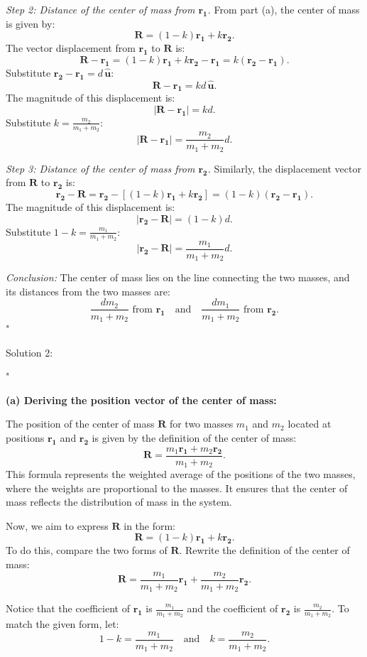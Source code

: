\textit{Step 2: Distance of the center of mass from $\mathbf{r_1}$.}  
From part (a), the center of mass is given by:
\[
\mathbf{R} = (1 - k)\mathbf{r_1} + k\mathbf{r_2}.
\]
The vector displacement from $\mathbf{r_1}$ to $\mathbf{R}$ is:
\[
\mathbf{R} - \mathbf{r_1} = (1 - k)\mathbf{r_1} + k\mathbf{r_2} - \mathbf{r_1} = k(\mathbf{r_2} - \mathbf{r_1}).
\]
Substitute $\mathbf{r_2} - \mathbf{r_1} = d \, \hat{\mathbf{u}}$:
\[
\mathbf{R} - \mathbf{r_1} = k d \, \hat{\mathbf{u}}.
\]
The magnitude of this displacement is:
\[
|\mathbf{R} - \mathbf{r_1}| = k d.
\]
Substitute $k = \frac{m_2}{m_1 + m_2}$:
\[
|\mathbf{R} - \mathbf{r_1}| = \frac{m_2}{m_1 + m_2} d.
\]

\textit{Step 3: Distance of the center of mass from $\mathbf{r_2}$.}  
Similarly, the displacement vector from $\mathbf{R}$ to $\mathbf{r_2}$ is:
\[
\mathbf{r_2} - \mathbf{R} = \mathbf{r_2} - \left[(1 - k)\mathbf{r_1} + k\mathbf{r_2}\right] = (1 - k)(\mathbf{r_2} - \mathbf{r_1}).
\]
The magnitude of this displacement is:
\[
|\mathbf{r_2} - \mathbf{R}| = (1 - k)d.
\]
Substitute $1 - k = \frac{m_1}{m_1 + m_2}$:
\[
|\mathbf{r_2} - \mathbf{R}| = \frac{m_1}{m_1 + m_2} d.
\]

\textit{Conclusion:}  
The center of mass lies on the line connecting the two masses, and its distances from the two masses are:
\[
\frac{d m_2}{m_1 + m_2} \text{ from } \mathbf{r_1} \quad \text{and} \quad \frac{d m_1}{m_1 + m_2} \text{ from } \mathbf{r_2}.
\]"

Solution 2:

"

\textbf{(a) Deriving the position vector of the center of mass:}

The position of the center of mass $\mathbf{R}$ for two masses $m_1$ and $m_2$ located at positions $\mathbf{r_1}$ and $\mathbf{r_2}$ is given by the definition of the center of mass:
\[
\mathbf{R} = \frac{m_1\mathbf{r_1} + m_2\mathbf{r_2}}{m_1 + m_2}.
\]
This formula represents the weighted average of the positions of the two masses, where the weights are proportional to the masses. It ensures that the center of mass reflects the distribution of mass in the system.

Now, we aim to express $\mathbf{R}$ in the form:
\[
\mathbf{R} = (1 - k)\mathbf{r_1} + k\mathbf{r_2}.
\]
To do this, compare the two forms of $\mathbf{R}$. Rewrite the definition of the center of mass:
\[
\mathbf{R} = \frac{m_1}{m_1 + m_2}\mathbf{r_1} + \frac{m_2}{m_1 + m_2}\mathbf{r_2}.
\]

Notice that the coefficient of $\mathbf{r_1}$ is $\frac{m_1}{m_1 + m_2}$ and the coefficient of $\mathbf{r_2}$ is $\frac{m_2}{m_1 + m_2}$. To match the given form, let:
\[
1 - k = \frac{m_1}{m_1 + m_2} \quad \text{and} \quad k = \frac{m_2}{m_1 + m_2}.
\]

